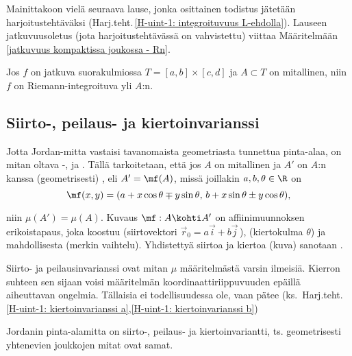 Mainittakoon vielä seuraava lause, jonka osittainen todistus jätetään harjoitustehtäväksi
(Harj.teht.\,\ref{H-uint-1: integroituvuus L-ehdolla}). Lauseen jatkuvuusoletus
(jota harjoitustehtävässä on vahvistettu) viittaa Määritelmään
\ref{jatkuvuus kompaktissa joukossa - Rn}.
\begin{*Lause} \label{jatkuvan funktion integroituvuus tasossa}
Jos $f$ on jatkuva suorakulmiossa $T=[a,b]\times[c,d]$ ja $A \subset T$ on mitallinen, niin
$f$ on Riemann-integroituva yli $A$:n.
\end{*Lause} 

\subsection*{Siirto-, peilaus- ja kiertoinvarianssi}

Jotta Jordan-mitta vastaisi tavanomaista geometriasta tunnettua pinta-alaa, on mitan oltava
-,  ja  . Tällä tarkoitetaan, että jos $A$ on
mitallinen ja $A'$ on $A$:n kanssa (geometrisesti)
%
, eli $A'=\mf(A)$, missä joillakin $a,b,\theta\in\R$ on
\[
\mf(x,y)=(a+x\cos\theta \mp y\sin\theta,\,b+x\sin\theta \pm y\cos\theta),
\]
\begin{figure}[H]
\begin{center}

\end{center}
\end{figure}
niin $\mu(A')=\mu(A)$. Kuvaus $\mf:A \kohti A'$ on affiinimuunnoksen erikoistapaus, joka
koostuu  (siirtovektori $\vec r_0=a\vec i + b\vec j\,$),   
(kiertokulma $\theta$) ja mahdollisesta  (merkin vaihtelu). Yhdistettyä
siirtoa ja kiertoa (kuva) sanotaan
%
.  

Siirto- ja peilausinvarianssi ovat mitan $\mu$ määritelmästä varsin ilmeisiä. Kierron suhteen 
sen sijaan voisi määritelmän koordinaattiriippuvuuden epäillä aiheuttavan ongelmia. Tällaisia
ei todellisuudessa ole, vaan pätee
(ks.\ Harj.teht.\,\ref{H-uint-1: kiertoinvarianssi a},\ref{H-uint-1: kiertoinvarianssi b})
\begin{Lause}
Jordanin pinta-alamitta on siirto-, peilaus- ja kiertoinvariantti, ts. geometrisesti yhtenevien
joukkojen mitat ovat samat.
\end{Lause}

